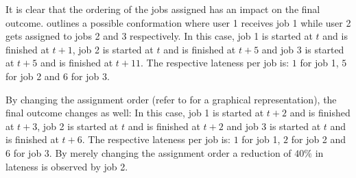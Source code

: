 \documentclass{seal_thesis}
\begin{document}
It is clear that the ordering of the jobs assigned has an impact on the final outcome.  outlines a possible conformation where user 1 receives job 1 while user 2 gets assigned to jobs 2 and 3 respectively. In this case, job 1 is started at $t$ and is finished at $t+1$, job 2 is started at $t$ and is finished at $t+5$ and job 3 is started at $t+5$ and is finished at $t+11$. The respective lateness per job is: $1$ for job 1, $5$ for job 2 and $6$ for job $3$.

By changing the assignment order (refer to  for a graphical representation), the final outcome changes as well: In this case, job 1 is started at $t+2$ and is finished at $t+3$, job 2 is started at $t$ and is finished at $t+2$ and job 3 is started at $t$ and is finished at $t+6$. The respective lateness per job is: $1$ for job 1, $2$ for job 2 and $6$ for job $3$. By merely changing the assignment order a reduction of $40\%$ in lateness is observed by job 2.
\end{document}
